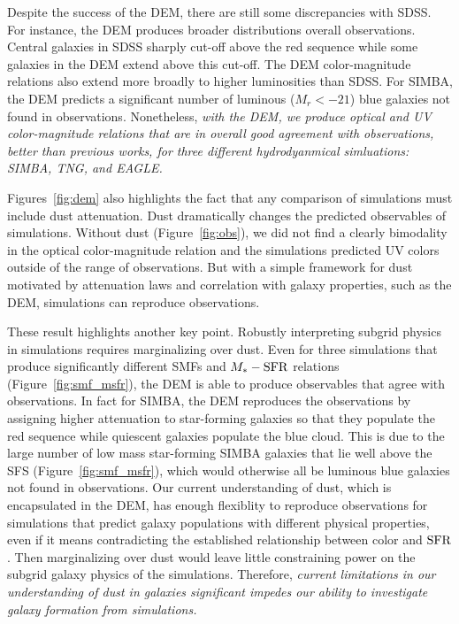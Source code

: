 Despite the success of the DEM, there are still some discrepancies with SDSS. 
For instance, the DEM produces broader distributions overall observations.
Central galaxies in SDSS sharply cut-off above the red sequence while some
galaxies in the DEM extend above this cut-off. The DEM color-magnitude
relations also extend more broadly to higher luminosities than SDSS. For SIMBA,
the DEM predicts a significant number of luminous ($M_r < -21$) blue galaxies 
not found in observations. Nonetheless, \emph{with the DEM, we produce optical
and UV color-magnitude relations that are in overall good agreement with
observations, better than previous works, for three different hydrodyanmical
simluations: SIMBA, TNG, and EAGLE.}

Figures~\ref{fig:dem} also highlights the fact that any comparison of
simulations must include dust attenuation. Dust dramatically changes the
predicted observables of simulations. Without dust (Figure~\ref{fig:obs}), we
did not find a clearly bimodality in the optical color-magnitude relation and
the simulations predicted UV colors outside of the range of observations.
But with a simple framework for dust motivated by attenuation laws and 
correlation with galaxy properties, such as the DEM, simulations can 
reproduce observations. 

These result highlights another key point. Robustly interpreting subgrid
physics in simulations requires marginalizing over dust. Even for three
simulations that produce significantly different SMFs and $M_*-{\rm SFR}$ relations
(Figure~\ref{fig:smf_msfr}), the DEM is able to produce observables that agree
with observations. In fact for SIMBA, the DEM reproduces the observations by assigning
higher attenuation to star-forming galaxies so that they populate the red sequence 
while quiescent galaxies populate the blue cloud. This is due to the large
number of low mass star-forming SIMBA galaxies that lie well above the SFS
(Figure~\ref{fig:smf_msfr}), which would otherwise all be luminous blue
galaxies not found in observations. Our current understanding of dust, which is
encapsulated in the DEM, has enough flexiblity to reproduce observations 
for simulations that predict galaxy populations with different physical
properties, even if it means contradicting the established relationship 
between color and ${\rm SFR}$. Then marginalizing over dust would leave little 
constraining power on the subgrid galaxy physics of the simulations. 
Therefore, \emph{current limitations in our understanding of dust in 
galaxies significant impedes our ability to investigate galaxy 
formation from simulations.}

